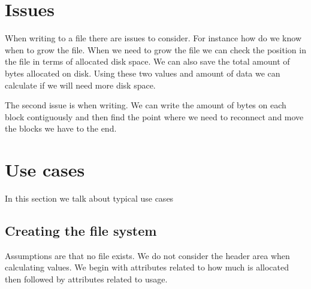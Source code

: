 \documentclass{article}
\begin{document}
\section*{Issues}

When writing to a file there are issues to consider.
For instance how do we know when to grow the file.
When we need to grow the file we can check the position in the file in terms of allocated disk space.
We can also save the total amount of bytes allocated on disk.
Using these two values and amount of data we can calculate if we will need more disk space.

The second issue is when writing.  We can write the amount of bytes on each block contiguously and then
find the point where we need to reconnect and move the blocks we have to the end.

\section*{Use cases}

In this section we talk about typical use cases

\subsection*{Creating the file system}

Assumptions are that no file exists.
We do not consider the header area when calculating values.
We begin with attributes related to how much is allocated then followed by attributes related to usage.
\end{document}
